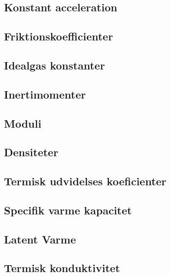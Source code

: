 \documentclass{article}
\begin{document}
{		\subsection{Konstant acceleration}
		

		\subsection{Friktionskoefficienter}
		

		\subsection{Idealgas konstanter}
		

		\subsection{Inertimomenter}
		

		\subsection{Moduli}
		

		\subsection{Densiteter}
		

		\subsection{Termisk udvidelses koeficienter}
		

		\subsection{Specifik varme kapacitet}
		

		\subsection{Latent Varme}
		

		\subsection{Termisk konduktivitet}
		

}
\end{document}

